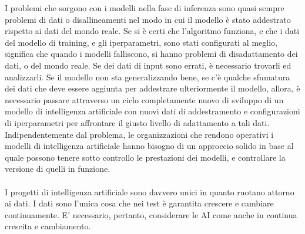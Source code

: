\documentclass[a4paper,12pt]{report}
\begin{document}
I problemi che sorgono con i modelli nella fase di inferenza sono quasi sempre problemi di dati o disallineamenti nel modo in cui il modello è stato addestrato rispetto ai dati del mondo reale. Se si è certi che l'algoritmo funziona, e che i dati del modello di training, e gli iperparametri, sono stati configurati al meglio, significa che quando i modelli falliscono, si hanno problemi di disadattamento dei dati, o del mondo reale. Se dei dati di input sono errati, è necessario trovarli ed analizzarli. Se il modello non sta generalizzando bene, se c'è qualche sfumatura dei dati che deve essere aggiunta per addestrare ulteriormente il modello, allora, è necessario passare attraverso un ciclo completamente nuovo di sviluppo di un modello di intelligenza artificiale con nuovi dati di addestramento e configurazioni di iperparametri per affrontare il giusto livello di adattamento a tali dati. Indipendentemente dal problema, le organizzazioni che rendono operativi i modelli di intelligenza artificiale hanno bisogno di un approccio solido in base al quale possono tenere sotto controllo le prestazioni dei modelli, e controllare la versione di quelli in funzione.\\~\\
I progetti di intelligenza artificiale sono davvero unici in quanto ruotano attorno ai dati. I dati sono l'unica cosa che nei test è garantita crescere e cambiare continuamente. E' necessario, pertanto, considerare le AI come anche in continua crescita e cambiamento. \cite{aitest}
\end{document}
